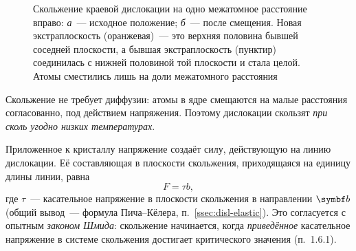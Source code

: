 \begin{figure}[ht]
\centering
\begin{subfigure}[b]{0.48\textwidth}\centering
{}
\caption{}
\end{subfigure}\hfill
\begin{subfigure}[b]{0.48\textwidth}\centering
{}
\caption{}
\end{subfigure}
\caption{Скольжение краевой дислокации на одно межатомное расстояние
вправо: \textit{а}~— исходное положение; \textit{б}~— после смещения.
Новая экстраплоскость (оранжевая)~— это верхняя половина бывшей соседней
плоскости, а бывшая экстраплоскость (пунктир) соединилась с нижней
половиной той плоскости и стала целой. Атомы сместились лишь на доли
межатомного расстояния}
\label{fig:edge-glide}
\end{figure}

\begin{glavnoe}
Скольжение не требует диффузии: атомы в ядре смещаются на малые
расстояния согласованно, под действием напряжения. Поэтому дислокации
скользят \emph{при сколь угодно низких температурах}.
\end{glavnoe}

Приложенное к кристаллу напряжение создаёт силу, действующую на линию
дислокации. Её составляющая в плоскости скольжения, приходящаяся на
единицу длины линии, равна
\begin{equation}\label{eq:F-glide}
F=\tau b ,
\end{equation}
где $\tau$~— касательное напряжение в плоскости скольжения в направлении
$\vb b$ (общий вывод~— формула Пича--Кёлера, п.~\ref{ssec:disl-elastic}).
Это согласуется с опытным \emph{законом Шмида}: скольжение начинается,
когда \emph{приведённое} касательное напряжение в системе скольжения
достигает критического значения (п.~1.6.1).

